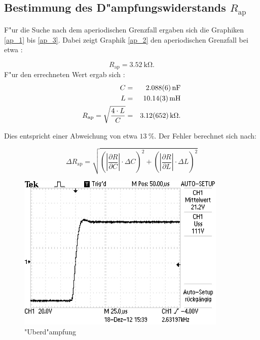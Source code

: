 	

	\newpage

	\subsection{Bestimmung des D"ampfungswiderstands $R_\mathrm{ap}$} %
	\label{sub:bestimmung_des_d_ampfungswiderstands_r_}
	

	F"ur die Suche nach dem aperiodischen Grenzfall ergaben sich die Graphiken \eqref{ap_1} bis \eqref{ap_3}.
	Dabei zeigt Graphik \eqref{ap_2} den aperiodischen Grenzfall bei etwa :

	\begin{equation*}
		R_\mathrm{ap} = \SI{3.52}{\kilo\ohm}.
	\end{equation*}
		F"ur den errechneten Wert ergab sich :
	\begin{eqnarray*}
		C &=& \SI{2.088 (6)}{\nano \farad}\\
		L &=& \SI{10.14 (3)}{\milli \henry}\\
		R_\mathrm{ap} = \sqrt{\frac{4 \cdot L}{C}} &=& \SI{3.12 (652)}{\kilo\ohm}.
	\end{eqnarray*}

	Dies entspricht einer Abweichung von etwa $\SI{13}{\%}$.
	Der Fehler berechnet sich nach:

	\begin{equation}
		\Delta R_\mathrm{ap} = \sqrt{ \left( |\frac{\partial R}{\partial C}| \cdot \Delta C \right)^2 + \left( |\frac{\partial R}{\partial L}| \cdot \Delta L \right)^2}
	\end{equation}

\clearpage

	\begin{figure}[!h]
			\centering
			\includegraphics[width = 10cm]{img/F0003TEK.jpg}
			\caption{"Uberd"ampfung}
			\label{ap_1}
		\end{figure}	

